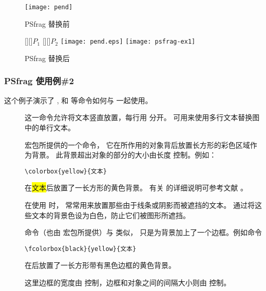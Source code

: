 \begin{figure}
\begin{minipage}[t]{.5\textwidth}
\vspace{0pt}
\centering
\texttt{[image: pend]}
\caption{PSfrag 替换前}\label{fig:nopsfrag}
\end{minipage}%
\begin{minipage}[t]{.5\textwidth}
\vspace{0pt}
\centering
\ifdvips
{}
[][]{$P_1$}
[][]{\large $P_2$}
\texttt{[image: pend.eps]}
\else
\texttt{[image: psfrag-ex1]}
\fi
\caption{PSfrag 替换后}\label{fig:psfragex1}
\end{minipage}
\end{figure}

\subsubsection{PSfrag 使用例\#2}\label{sssec:psfragex2}

这个例子演示了 ,  和  等命令如何与  一起使用。

\begin{description}
\item[] 这一命令允许将文本竖直放置，每行用 \cmd{\cmd{}} 分开。
	可用来使用多行文本替换图中的单行文本。
\item[]  宏包所提供的一个命令，
	它在所作用的对象背后放置长方形的彩色区域作为背景。
	此背景超出对象的部分的大小由长度  控制。例如：
\begin{lstlisting}
\colorbox{yellow}{文本}
\end{lstlisting}
	在{\colorbox{yellow}{文本}}后放置了一长方形的黄色背景。
	有关  的详细说明可参考文献 \cite{grfguide}。

	在使用  时， 常常用来放置那些由于线条或阴影而被遮挡的文本。
	通过将这些文本的背景色设为白色，防止它们被图形所遮挡。
\item[] 命令（也由  宏包所提供）与  类似，
	只是为背景加上了一个边框。例如命令
\begin{Verbatim}
\fcolorbox{black}{yellow}{文本}
\end{Verbatim}
	在{}后放置了一长方形带有黑色边框的黄色背景。

	这里边框的宽度由  控制，边框和对象之间的间隔大小则由  控制。
\end{description}


